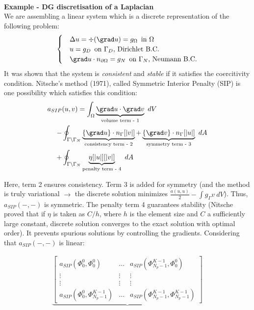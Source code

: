 \documentclass[b1b,portrait]{b0poster}
\begin{document}
\begin{minipage}[t][79cm][t]{0.3\linewidth}
  \large
  \textcolor{fsbBlue}{%
    \Large \bfseries
    \\Example - DG discretisation of a Laplacian
  }\\
We are assembling a linear system which is a discrete representation of the
following problem:
\begin{align*}
\begin{cases}
& \Delta u = \div (\grad u) = g_{\Omega} \, \text{ in $\Omega$} \\
& u = g_D \, \text{ on $\Gamma_D$, Dirichlet B.C.} \\
& \grad u \cdot n_{\partial \Omega} = g_N \, \text{ on $\Gamma_N$, Neumann B.C.}
\end{cases}
\end{align*}
It was shown that the system is \textit{consistent} and \textit{stable} if it
satisfies the coercitivity condition. Nitsche's method (1971), called Symmetric
Interior Penalty (SIP) is one possibility which satisfies this condition:
\begin{align*}
a_{SIP}&(u,v)
= \int_{\Omega} \underbrace{\grad u \cdot \grad v}_{\text{volume term - 1}}\ dV \\
 - &\oint_{\Gamma \setminus \Gamma_N} \underbrace{\{ \grad u\} \cdot n_\Gamma [|v|]}_{\text{consistency term - 2}} + \underbrace{\{ \grad v\} \cdot n_\Gamma [|u|]}_{\text{symmetry term - 3}}\ dA \\
 + &\oint_{\Gamma \setminus \Gamma_N} \underbrace{\eta [|u|][|v|]}_{\text{penalty term - 4}}\ dA
\end{align*}
\parbox{\textwidth}{
Here, term 2 ensures consistency. Term 3 is added for symmetry (and the method
is truly variational $\rightarrow$
the discrete solution minimizes $\frac{a(u,u)}{2} - \int g_{\Gamma}v\ dV$).
Thus, $a_{SIP}(-,-)$ is symmetric. The penalty term 4 guarantees
stability (Nitsche proved that if $\eta$ is taken as $C/h$, where $h$ is the
element size and $C$ a sufficiently large constant, discrete solution converges
to the exact solution with optimal order). It prevents spurious solutions by
controlling the gradients.
Considering that $a_{SIP}(-,-)$ is linear:}
\small
\begin{align*}
\underbrace{\begin{bmatrix}
a_{SIP}(\Phi^0_0, \Phi^0_0) & \hdots  & a_{SIP}(\Phi^{K - 1}_{N_p - 1}, \Phi^0_0) \\
\vdots & \vdots & \vdots \\
\vdots & \vdots & \vdots \\
a_{SIP}(\Phi^0_0, \Phi^{K - 1}_{N_p - 1}) & \hdots  & a_{SIP}(\Phi^{K - 1}_{N_p - 1}, \Phi^{K - 1}_{N_p - 1})

\end{bmatrix}}
\end{align*}
\end{minipage}
\end{document}
